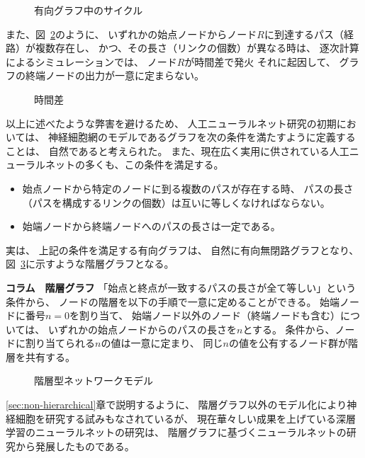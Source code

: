\begin{figure}
  \centering
  
  \caption{有向グラフ中のサイクル}
  \label{fig:cycle}
\end{figure}

また、図~\ref{fig:time-diference}のように、
いずれかの始点ノードからノード$R$に到達するパス（経路）が複数存在し、
かつ、その長さ（リンクの個数）が異なる時は、
逐次計算によるシミュレーションでは、
ノード$R$が時間差で発火
それに起因して、
グラフの終端ノードの出力が一意に定まらない。

\begin{figure}
  \centering
  
  \caption{時間差}
  \label{fig:time-diference}
\end{figure}

以上に述べたような弊害を避けるため、
人工ニューラルネット研究の初期においては、
神経細胞網のモデルであるグラフを次の条件を満たすように定義することは、
自然であると考えられた。
また、現在広く実用に供されている人工ニューラルネットの多くも、この条件を満足する。
\begin{itemize}
\item 始点ノードから特定のノードに到る複数のパスが存在する時、
  パスの長さ（パスを構成するリンクの個数）は互いに等しくなければならない。
\item 始端ノードから終端ノードへのパスの長さは一定である。
\end{itemize}
実は、
上記の条件を満足する有向グラフは、
自然に有向無閉路グラフとなり、
図~\ref{fig:hierarchical-model}に示すような階層グラフとなる。

\begin{itembox}{\bf コラム　階層グラフ}
  「始点と終点が一致するパスの長さが全て等しい」という条件から、
  ノードの階層を以下の手順で一意に定めることができる。
  始端ノードに番号$n = 0$を割り当て、
  始端ノード以外のノード（終端ノードも含む）については、
  いずれかの始点ノードからのパスの長さを$n$とする。
  条件から、ノードに割り当てられる$n$の値は一意に定まり、
  同じ$n$の値を公有するノード群が階層を共有する。
\end{itembox}

\begin{figure}
  \centering
  
  \caption{階層型ネットワークモデル}
  \label{fig:hierarchical-model}
\end{figure}

\ref{sec:non-hierarchical}章で説明するように、
階層グラフ以外のモデル化により神経細胞を研究する試みもなされているが、
現在華々しい成果を上げている深層学習のニューラルネットの研究は、
階層グラフに基づくニューラルネットの研究から発展したものである。

